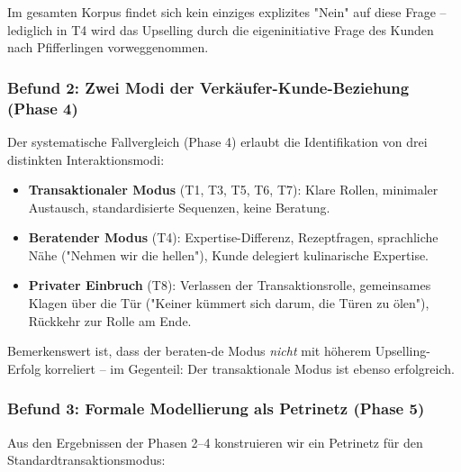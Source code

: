 \documentclass[12pt,a4paper]{article}
\begin{document}
Im gesamten Korpus findet sich kein einziges explizites "Nein" auf diese Frage – lediglich in T4 wird das Upselling durch die eigeninitiative Frage des Kunden nach Pfifferlingen vorweggenommen.

\subsubsection{Befund 2: Zwei Modi der Verkäufer-Kunde-Beziehung (Phase 4)}

Der systematische Fallvergleich (Phase 4) erlaubt die Identifikation von drei distinkten Interaktionsmodi:

\begin{itemize}
    \item \textbf{Transaktionaler Modus} (T1, T3, T5, T6, T7): Klare Rollen, minimaler Austausch, standardisierte Sequenzen, keine Beratung.
    \item \textbf{Beratender Modus} (T4): Expertise-Differenz, Rezeptfragen, sprachliche Nähe ("Nehmen wir die hellen"), Kunde delegiert kulinarische Expertise.
    \item \textbf{Privater Einbruch} (T8): Verlassen der Transaktionsrolle, gemeinsames Klagen über die Tür ("Keiner kümmert sich darum, die Türen zu ölen"), Rückkehr zur Rolle am Ende.
\end{itemize}

Bemerkenswert ist, dass der beraten-de Modus \textit{nicht} mit höherem Upselling-Erfolg korreliert – im Gegenteil: Der transaktionale Modus ist ebenso erfolgreich.

\subsubsection{Befund 3: Formale Modellierung als Petrinetz (Phase 5)}

Aus den Ergebnissen der Phasen 2–4 konstruieren wir ein Petrinetz für den Standardtransaktionsmodus:
\end{document}
